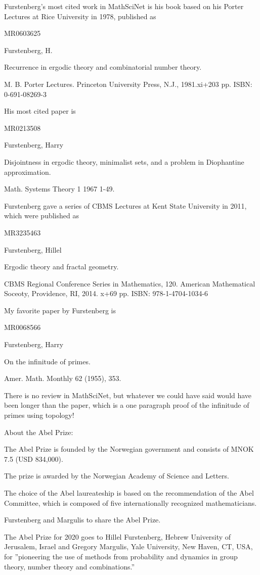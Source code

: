 Furstenberg's most cited work in MathSciNet
is his book based on his Porter Lectures at
Rice University in 1978, published as

MR0603625

Furstenberg, H.

Recurrence in
ergodic theory and combinatorial number
theory.

M. B. Porter Lectures. Princeton University
Press, N.J., 1981.xi+203 pp. ISBN:
0-691-08269-3

His most cited paper is

MR0213508

Furstenberg, Harry

Disjointness in ergodic theory,
minimalist sets, and a problem in
Diophantine approximation.

Math. Systems Theory 1 1967 1-49.

Furstenberg gave a series of CBMS
Lectures at Kent State University
in 2011, which were published as

MR3235463

Furstenberg, Hillel

Ergodic theory and fractal geometry.

CBMS Regional Conference Series in
Mathematics, 120. American Mathematical
Soceoty, Providence, RI, 2014. x+69
pp. ISBN: 978-1-4704-1034-6

My favorite paper by Furstenberg is

MR0068566

Furstenberg, Harry

On the infinitude of primes.

Amer. Math. Monthly 62 (1955), 353.

There is no review in MathSciNet,
but whatever we could have said would
have been longer than the paper, which
is a one paragraph proof of the infinitude
of primes using topology!

About the Abel Prize:

The Abel Prize is founded by the Norwegian
government and consists of MNOK 7.5
(USD 834,000).

The prize is awarded by the Norwegian
Academy of Science and Letters.

The choice of the Abel laureateship is based
on the recommendation of the Abel Committee,
which is composed of five internationally
recognized mathematicians.

Furstenberg and Margulis to share the Abel
Prize.

The Abel Prize for 2020 goes to Hillel
Furstenberg, Hebrew University of
Jerusalem, Israel and Gregory Margulis,
Yale University, New Haven, CT, USA,
for ''pioneering the use of methods
from probability and dynamics in group
theory, number theory and combinations.''

